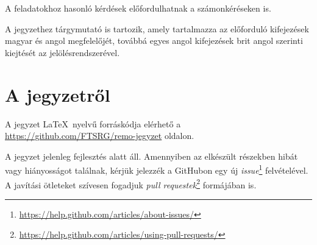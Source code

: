 \begin{tipp}
	A feladatokhoz hasonló kérdések előfordulhatnak a számonkéréseken is.
\end{tipp}

A jegyzethez tárgymutató is tartozik, amely tartalmazza az előforduló kifejezések magyar és angol megfelelőjét, továbbá egyes angol kifejezések brit angol szerinti kiejtését az  jelölésrendszerével.

\section*{A jegyzetről}

A jegyzet \LaTeX\ nyelvű forráskódja elérhető a \url{https://github.com/FTSRG/remo-jegyzet} oldalon.

A jegyzet jelenleg fejlesztés alatt áll. Amennyiben az elkészült részekben hibát vagy hiányosságot találnak, kérjük jelezzék a GitHubon egy új \emph{issue}\footnote{\url{https://help.github.com/articles/about-issues/}} felvételével. A javítási ötleteket szívesen fogadjuk \emph{pull requestek}\footnote{\url{https://help.github.com/articles/using-pull-requests/}} formájában is.
